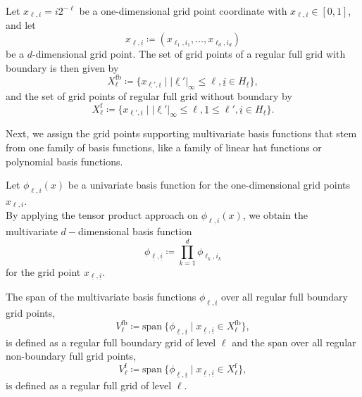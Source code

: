 \documentclass[
  a4paper,  %
  twoside,  %
  bibliography=totoc,
  headsepline,
  cleardoublepage=empty,
  parskip=half,
  draft=false
]{scrbook}
\begin{document}
\begin{definition}
Let $x_{\ell,i}=i2^{-\ell}$ be a one-dimensional grid point coordinate with $x_{\ell,i} \in [0,1]$, and let
\begin{equation}
x_{\underline{\ell},\underline{i}} \coloneqq (x_{\ell_1,i_1}, \dots, x_{\ell_d,i_d})
\end{equation}
be a $d$-dimensional grid point. The set of grid points of a regular full grid with boundary is then given by
\begin{equation}
X^{\mathrm{fb}}_{\ell} \coloneqq \{x_{\underline{\ell'},\underline{i}} \mid |\underline{\ell'}|_{\infty} \leq \ell, \underline{i} \in H_{\underline{\ell}}\},
\end{equation}
and the set of grid points of regular full grid without boundary by
\begin{equation}
X^{\mathrm{f}}_{\ell} \coloneqq \{x_{\underline{\ell'},\underline{i}} \mid |\underline{\ell'}|_{\infty} \leq \ell, \underline{1} \leq \ell',  \underline{i} \in H_{\underline{\ell}}\}.
\end{equation}
\end{definition}
%
Next, we assign the grid points supporting multivariate basis functions that stem from one family of basis functions, like a family of linear hat functions or polynomial basis functions.

\begin{definition}
Let $\phi_{\ell,i}(x)$ be a univariate basis function for the one-dimensional grid points $x_{\ell,i}$.\\
By applying the tensor product approach on $\phi_{\ell,i}(x)$, we obtain the multivariate $d-$dimensional basis function
\begin{equation}
\phi_{\underline{\ell},\underline{i}} \coloneqq \prod_{k=1}^{d} \phi_{\ell_k,i_k}
\label{eq:basis_functions}
\end{equation}
for the grid point $x_{\underline{\ell},\underline{i}}$.
\end{definition}
%
\begin{definition}
The span of the multivariate basis functions $\phi_{\underline{\ell},\underline{i}}$ over all regular full boundary grid points,
\begin{equation}
V^{\mathrm{fb}}_{\ell} \coloneqq \mathrm{span}~ \{\phi_{\underline{\ell},\underline{i}} \mid x_{\underline{\ell},\underline{i}} \in X^{\mathrm{fb}}_{\ell}\},
\nonumber
\end{equation}
is defined as a regular full boundary grid of level $\ell$ and the span over all regular non-boundary full grid points,
\begin{equation}
V^{\mathrm{f}}_{\ell} \coloneqq \mathrm{span}~ \{\phi_{\underline{\ell},\underline{i}} \mid x_{\underline{\ell},\underline{i}} \in X^{\mathrm{f}}_{\ell}\},
\end{equation}
is defined as a regular full grid of level $\ell$.
\label{def:full_grid}
\end{definition}
\end{document}
